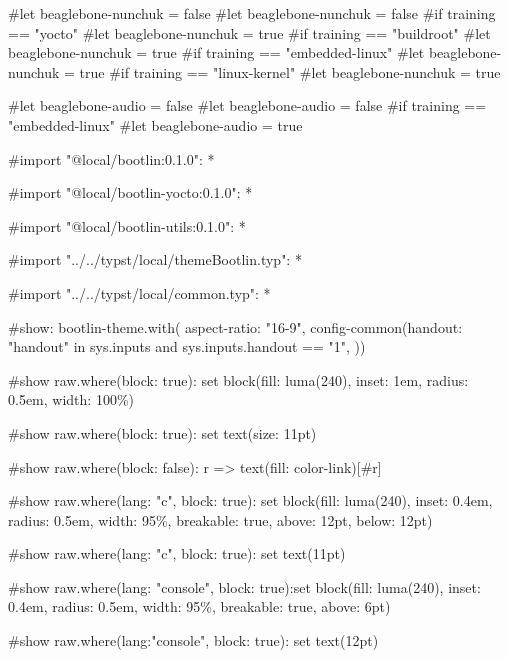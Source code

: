 #let beaglebone-nunchuk = false
#let beaglebone-nunchuk = false
#if training == "yocto" {#let beaglebone-nunchuk = true}
#if training == "buildroot" {#let beaglebone-nunchuk = true}
#if training == "embedded-linux" {#let beaglebone-nunchuk = true}
#if training == "linux-kernel" {#let beaglebone-nunchuk = true}

#let beaglebone-audio = false
#let beaglebone-audio = false
#if training == "embedded-linux" {#let beaglebone-audio = true}

#import "@local/bootlin:0.1.0": *

#import "@local/bootlin-yocto:0.1.0": *

#import "@local/bootlin-utils:0.1.0": *

#import "../../typst/local/themeBootlin.typ": *

#import "../../typst/local/common.typ": *

#show: bootlin-theme.with( aspect-ratio: "16-9", config-common(handout: "handout" in sys.inputs and sys.inputs.handout == "1", ))

#show raw.where(block: true): set block(fill: luma(240), inset: 1em, radius: 0.5em, width: 100\%)

#show raw.where(block: true): set text(size: 11pt)

#show raw.where(block: false): r => text(fill: color-link)[#r]

#show raw.where(lang: "c", block: true): set block(fill: luma(240), inset: 0.4em, radius: 0.5em, width: 95\%, breakable: true, above: 12pt, below: 12pt)

#show raw.where(lang: "c", block: true): set text(11pt)

#show raw.where(lang: "console", block: true):set block(fill: luma(240), inset: 0.4em, radius: 0.5em, width: 95\%, breakable: true, above: 6pt)

#show raw.where(lang:"console", block: true): set text(12pt)

